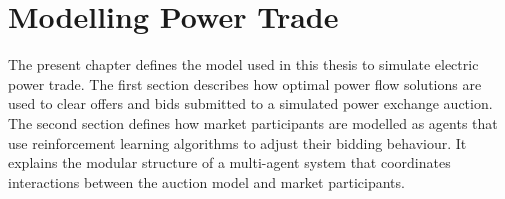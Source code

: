 \chapter{Modelling Power Trade}
\label{ch:method}
The present chapter defines the model used in this thesis to simulate electric
power trade. The first section describes how optimal power flow solutions are
used to clear offers and bids submitted to a simulated power exchange auction.
The second section defines how market participants are modelled as agents that
use reinforcement learning algorithms to adjust their bidding behaviour. It
explains the modular structure of a multi-agent system that coordinates
interactions between the auction model and market participants.

%
%
